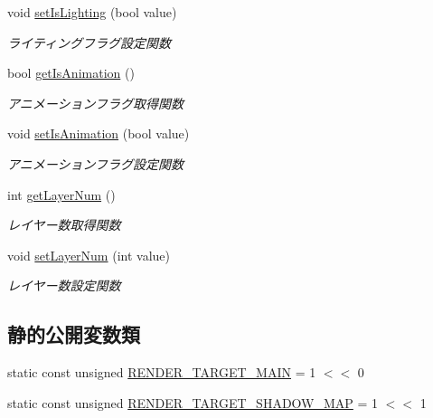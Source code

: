 \begin{DoxyCompactItemize}
void \mbox{\hyperlink{class_draw_order_list_a90504fdecaa6c022c8b85919352a10b1}{set\+Is\+Lighting}} (bool value)
\begin{DoxyCompactList}\small\item\em ライティングフラグ設定関数 \end{DoxyCompactList}\item 
bool \mbox{\hyperlink{class_draw_order_list_a7131fc4155b8a35108697ad9628f337f}{get\+Is\+Animation}} ()
\begin{DoxyCompactList}\small\item\em アニメーションフラグ取得関数 \end{DoxyCompactList}\item 
void \mbox{\hyperlink{class_draw_order_list_a31b85221bde032f5912219f79a93c100}{set\+Is\+Animation}} (bool value)
\begin{DoxyCompactList}\small\item\em アニメーションフラグ設定関数 \end{DoxyCompactList}\item 
int \mbox{\hyperlink{class_draw_order_list_afe5cb8651814f631146c91e6428c0b6d}{get\+Layer\+Num}} ()
\begin{DoxyCompactList}\small\item\em レイヤー数取得関数 \end{DoxyCompactList}\item 
void \mbox{\hyperlink{class_draw_order_list_a692fe6ddfbc8ac4167c697a1f8096c57}{set\+Layer\+Num}} (int value)
\begin{DoxyCompactList}\small\item\em レイヤー数設定関数 \end{DoxyCompactList}\end{DoxyCompactItemize}
\subsection*{静的公開変数類}
\begin{DoxyCompactItemize}
\item 
static const unsigned \mbox{\hyperlink{class_draw_order_list_a9b0fb07f07093ce5047373732c33fca1}{R\+E\+N\+D\+E\+R\+\_\+\+T\+A\+R\+G\+E\+T\+\_\+\+M\+A\+IN}} = 1 $<$$<$ 0
\item 
static const unsigned \mbox{\hyperlink{class_draw_order_list_a0ee325016a7e07c0be79c6440f3bfe53}{R\+E\+N\+D\+E\+R\+\_\+\+T\+A\+R\+G\+E\+T\+\_\+\+S\+H\+A\+D\+O\+W\+\_\+\+M\+AP}} = 1 $<$$<$ 1
\end{DoxyCompactItemize}
